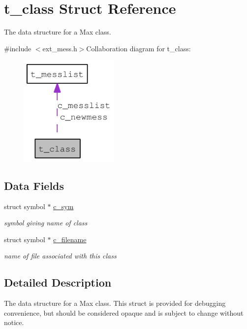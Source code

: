 \hypertarget{structt__class}{
\section{t\_\-class Struct Reference}
\label{structt__class}
}


The data structure for a Max class.  


{\ttfamily \#include $<$ext\_\-mess.h$>$}Collaboration diagram for t\_\-class:\nopagebreak
\begin{figure}[H]
\begin{center}
\leavevmode
\includegraphics[width=138pt]{structt__class__coll__graph}
\end{center}
\end{figure}
\subsection*{Data Fields}
\begin{DoxyCompactItemize}
\item 
\hypertarget{structt__class_acd4e149d4405cca175f994ead1ca51fb}{
struct symbol $\ast$ \hyperlink{structt__class_acd4e149d4405cca175f994ead1ca51fb}{c\_\-sym}}
\label{structt__class_acd4e149d4405cca175f994ead1ca51fb}

\begin{DoxyCompactList}\small\item\em symbol giving name of class \item\end{DoxyCompactList}\item 
\hypertarget{structt__class_afbc0e6fa8637f7207f813d809df61a05}{
struct symbol $\ast$ \hyperlink{structt__class_afbc0e6fa8637f7207f813d809df61a05}{c\_\-filename}}
\label{structt__class_afbc0e6fa8637f7207f813d809df61a05}

\begin{DoxyCompactList}\small\item\em name of file associated with this class \item\end{DoxyCompactList}\end{DoxyCompactItemize}


\subsection{Detailed Description}
The data structure for a Max class. This struct is provided for debugging convenience, but should be considered opaque and is subject to change without notice. 